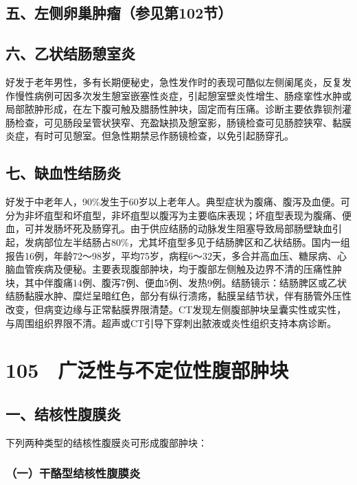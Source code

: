 \subsection{五、左侧卵巢肿瘤（参见第102节）}

\subsection{六、乙状结肠憩室炎}

好发于老年男性，多有长期便秘史，急性发作时的表现可酷似左侧阑尾炎，反复发作慢性病例可因多次发生憩室嵌塞性炎症，引起憩室壁炎性增生、肠痉挛性水肿或局部脓肿形成，在左下腹可触及腊肠性肿块，固定而有压痛。诊断主要依靠钡剂灌肠检查，可见肠段呈管状狭窄、充盈缺损及憩室影，肠镜检查可见肠腔狭窄、黏膜炎症，有时可见憩室。但急性期禁忌作肠镜检查，以免引起肠穿孔。

\subsection{七、缺血性结肠炎}

好发于中老年人，90\%发生于60岁以上老年人。典型症状为腹痛、腹泻及血便。可分为非坏疽型和坏疽型，非坏疽型以腹泻为主要临床表现；坏疽型表现为腹痛、便血，可并发肠坏死及肠穿孔。由于供应结肠的动脉发生阻塞导致局部肠壁缺血引起，发病部位左半结肠占80\%，尤其坏疽型多见于结肠脾区和乙状结肠。国内一组报告16例，年龄72～98岁，平均75岁，病程6～32天，多合并高血压、糖尿病、心脑血管疾病及便秘。主要表现腹部肿块，均于腹部左侧触及边界不清的压痛性肿块，其中伴腹痛14例、腹泻7例、便血5例、发热9例。结肠镜示：结肠脾区或乙状结肠黏膜水肿、糜烂呈暗红色，部分有纵行溃疡，黏膜呈结节状，伴有肠管外压性改变，但病变边缘与正常黏膜界限清楚。CT发现左侧腹部肿块呈囊实性或实性，与周围组织界限不清。超声或CT引导下穿刺出脓液或炎性组织支持本病诊断。

\protect\hypertarget{text00236.html}{}{}

\section{105　广泛性与不定位性腹部肿块}

\subsection{一、结核性腹膜炎}

下列两种类型的结核性腹膜炎可形成腹部肿块：

\subsubsection{（一）干酪型结核性腹膜炎}

